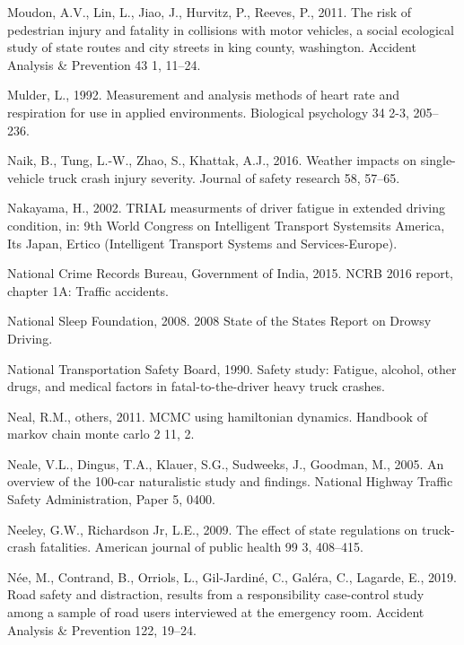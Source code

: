 \documentclass[12pt]{book}
\numberwithin{equation}{chapter}
\begin{document}
\leavevmode\hypertarget{ref-moudon2011risk}{}%
Moudon, A.V., Lin, L., Jiao, J., Hurvitz, P., Reeves, P., 2011. The risk of pedestrian injury and fatality in collisions with motor vehicles, a social ecological study of state routes and city streets in king county, washington. Accident Analysis \& Prevention 43 1, 11--24.

\leavevmode\hypertarget{ref-mulder1992measurement}{}%
Mulder, L., 1992. Measurement and analysis methods of heart rate and respiration for use in applied environments. Biological psychology 34 2-3, 205--236.

\leavevmode\hypertarget{ref-naik2016weather}{}%
Naik, B., Tung, L.-W., Zhao, S., Khattak, A.J., 2016. Weather impacts on single-vehicle truck crash injury severity. Journal of safety research 58, 57--65.

\leavevmode\hypertarget{ref-nakayama2002trial}{}%
Nakayama, H., 2002. TRIAL measurments of driver fatigue in extended driving condition, in: 9th World Congress on Intelligent Transport Systemsits America, Its Japan, Ertico (Intelligent Transport Systems and Services-Europe).

\leavevmode\hypertarget{ref-india2015}{}%
National Crime Records Bureau, Government of India, 2015. NCRB 2016 report, chapter 1A: Traffic accidents.

\leavevmode\hypertarget{ref-nsleepf}{}%
National Sleep Foundation, 2008. 2008 State of the States Report on Drowsy Driving.

\leavevmode\hypertarget{ref-ntsb1990}{}%
National Transportation Safety Board, 1990. Safety study: Fatigue, alcohol, other drugs, and medical factors in fatal-to-the-driver heavy truck crashes.

\leavevmode\hypertarget{ref-neal2011mcmc}{}%
Neal, R.M., others, 2011. MCMC using hamiltonian dynamics. Handbook of markov chain monte carlo 2 11, 2.

\leavevmode\hypertarget{ref-neale2005overview}{}%
Neale, V.L., Dingus, T.A., Klauer, S.G., Sudweeks, J., Goodman, M., 2005. An overview of the 100-car naturalistic study and findings. National Highway Traffic Safety Administration, Paper 5, 0400.

\leavevmode\hypertarget{ref-neeley2009effect}{}%
Neeley, G.W., Richardson Jr, L.E., 2009. The effect of state regulations on truck-crash fatalities. American journal of public health 99 3, 408--415.

\leavevmode\hypertarget{ref-nee2019road}{}%
Née, M., Contrand, B., Orriols, L., Gil-Jardiné, C., Galéra, C., Lagarde, E., 2019. Road safety and distraction, results from a responsibility case-control study among a sample of road users interviewed at the emergency room. Accident Analysis \& Prevention 122, 19--24.
\end{document}
